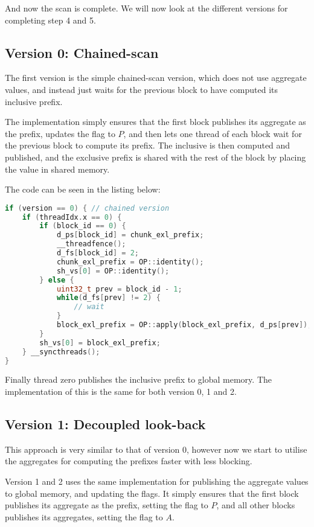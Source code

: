 And now the scan is complete.
We will now look at the different versions for completing step 4 and 5.

\subsection{Version 0: Chained-scan}
The first version is the simple chained-scan version, which does not use aggregate values, and instead just waits for the previous block to have computed its inclusive prefix.

The implementation simply ensures that the first block publishes its aggregate as the prefix,
updates the flag to $P$,
and then lets one thread of each block wait for the previous block to compute its prefix.
The inclusive is then computed and published, and the exclusive prefix is shared with the rest of the block by placing the value in shared memory.

The code can be seen in the listing below:
\begin{lstlisting}[language=c++]
if (version == 0) { // chained version
    if (threadIdx.x == 0) {
        if (block_id == 0) {
            d_ps[block_id] = chunk_exl_prefix;
            __threadfence();
            d_fs[block_id] = 2;
            chunk_exl_prefix = OP::identity();
            sh_vs[0] = OP::identity();
        } else {
            uint32_t prev = block_id - 1;
            while(d_fs[prev] != 2) {
                // wait
            }
            block_exl_prefix = OP::apply(block_exl_prefix, d_ps[prev]);
        }
        sh_vs[0] = block_exl_prefix;
    } __syncthreads();
}
\end{lstlisting}

Finally thread zero publishes the inclusive prefix to global memory.
The implementation of this is the same for both version 0, 1 and 2.


\subsection{Version 1: Decoupled look-back}
This approach is very similar to that of version 0, however now we start to utilise the aggregates for computing the prefixes faster with less blocking.

Version 1 and 2 uses the same implementation for publishing the aggregate values to global memory, and updating the flags.
It simply ensures that the first block publishes its aggregate as the prefix, setting the flag to $P$, and all other blocks publishes its aggregates, setting the flag to $A$.

